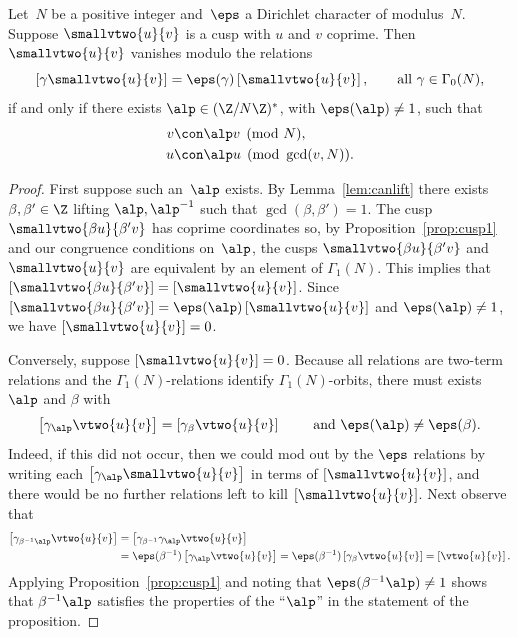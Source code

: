 \begin{proposition}\label{prop:cuspdies}
Let~$N$ be a positive integer and~$\eps$ a Dirichlet
character of modulus~$N$. 
Suppose $\smallvtwo{u}{v}$ is a cusp with $u$ and $v$ coprime.
Then $\smallvtwo{u}{v}$ vanishes modulo the relations
$$
\left[\gamma\smallvtwo{u}{v}\right]=
\eps(\gamma)\left[\smallvtwo{u}{v}\right],\qquad
\text{all $\gamma\in\Gamma_0(N)$},
$$
if and only if there exists $\alp\in(\Z/N\Z)^*$,
with $\eps(\alp)\neq 1$, such that
\begin{align*}
 v &\con \alp v \pmod{N},\\
 u &\con \alp u \pmod{\gcd(v,N)}.
\end{align*}
\end{proposition}
\begin{proof}
First suppose such an~$\alp$ exists.
By Lemma~\ref{lem:canlift}
there exists $\beta, \beta'\in\Z$ lifting
$\alp,\alp^{-1}$ such that $\gcd(\beta,\beta')=1$. 
The cusp $\smallvtwo{\beta u}{\beta' v}$ 
has coprime coordinates so,
by Proposition~\ref{prop:cusp1} and our
congruence conditions on~$\alp$, the cusps
$\smallvtwo{\beta{}u}{\beta'{}v}$ 
and $\smallvtwo{u}{v}$ are equivalent by
an element of $\Gamma_1(N)$.
This implies that $\left[\smallvtwo{\beta{}u}{\beta'{}v}\right]
   =\left[\smallvtwo{u}{v}\right]$.  
Since $\left[\smallvtwo{\beta{}u}{\beta'{}v}\right]
  = \eps(\alp)\left[\smallvtwo{u}{v}\right]$
and $\eps(\alp)\neq 1$, we have $\left[\smallvtwo{u}{v}\right]=0$. 

Conversely, suppose $\left[\smallvtwo{u}{v}\right]=0$. 
Because all relations are two-term relations and the
$\Gamma_1(N)$-relations identify $\Gamma_1(N)$-orbits,
there must exists $\alp$ and $\beta$ with
  $$\left[\gamma_\alp \vtwo{u}{v}\right]
      =\left[\gamma_\beta \vtwo{u}{v}\right]
   \qquad\text{ and }\eps(\alp)\ne \eps(\beta).$$
Indeed, if this did not occur,
then we could mod out by the $\eps$ relations by writing
each $\left[\gamma_\alp \smallvtwo{u}{v} \right]$
in terms of  $\left[\smallvtwo{u}{v}\right]$, and there would
be no further relations left to kill 
$\left[\smallvtwo{u}{v}\right]$.
Next observe that
\begin{align*}
\left[\gamma_{\beta^{-1}\alp}
      \vtwo{u}{v}\right]
  &= \left[\gamma_{\beta^{-1}}\gamma_\alp
      \vtwo{u}{v}\right]\\
 &= \eps(\beta^{-1})\left[\gamma_\alp
      \vtwo{u}{v}\right]
 = \eps(\beta^{-1})\left[\gamma_\beta
      \vtwo{u}{v}\right]
 = \left[\vtwo{u}{v}\right].
\end{align*}
Applying Proposition~\ref{prop:cusp1} and
noting that $\eps(\beta^{-1}\alp)\neq 1$ shows 
that $\beta^{-1}\alp$ satisfies the properties
of the ``$\alp$'' in the statement of the
proposition.
\end{proof}

